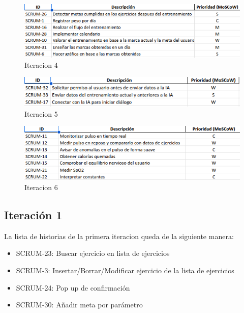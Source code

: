 \begin{figure}[H]
   \centering
    \includegraphics[width=1.1\textwidth]{tablas/iter4.png}
    \caption{Iteracion 4}
    \label{fig:iter4}
\end{figure}

\begin{figure}[H]
   \centering
    \includegraphics[width=1.1\textwidth]{tablas/iter5.png}
    \caption{Iteracion 5}
    \label{fig:iter5}
\end{figure}

\begin{figure}[H]
   \centering
    \includegraphics[width=1.1\textwidth]{tablas/iter6.png}
    \caption{Iteracion 6}
    \label{fig:iter6}
\end{figure}

\subsection{Iteración 1}
La lista de historias de la primera iteracion queda de la siguiente manera:

\begin{itemize}
    \item SCRUM-23: Buscar ejercicio en lista de ejercicios
    \item SCRUM-3: Insertar/Borrar/Modificar ejercicio de la lista de ejercicios
    \item SCRUM-24: Pop up de confirmación
    \item SCRUM-30: Añadir meta por parámetro
\end{itemize}

